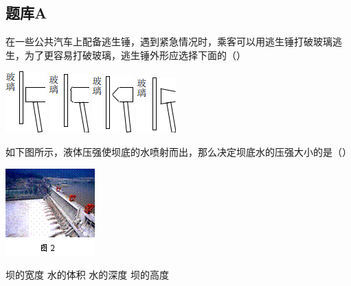 \documentclass[12pt]{exam}%
\begin{document}
\begin{Aquestions}
\newpage
\section{题库A}
\begin{questions}
\question
在一些公共汽车上配备逃生锤，遇到紧急情况时，乘客可以用逃生锤打破玻璃逃生，为了更容易打破玻璃，逃生锤外形应选择下面的（\answerline*[C]）
\begin{choices}
\begin{multicols}{4}
\choice \includegraphics[scale=1]{figures/图片1-1.png} 
\columnbreak
\choice \includegraphics[scale=1]{figures/图片1-2.png} 
\columnbreak
\choice \includegraphics[scale=1]{figures/图片1-3.png} 
\columnbreak
\choice \includegraphics[scale=1]{figures/图片1-4.png} 
\end{multicols}
\end{choices}

\question
如下图所示，液体压强使坝底的水喷射而出，那么决定坝底水的压强大小的是（\answerline*[C]）
\begin{multicols}{2}
\includegraphics[scale=1]{figures/图片2.png} 
\columnbreak
\begin{choices}
\choice 坝的宽度
\choice 水的体积
\choice 水的深度
\choice 坝的高度
\end{choices}
\end{multicols}



\end{questions}
\end{Aquestions}
\end{document}
